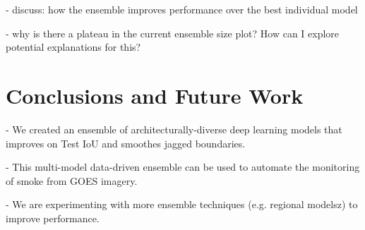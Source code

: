 \documentclass{article}
\begin{document}
- discuss: how the ensemble improves performance over the best individual model

- why is there a plateau in the current ensemble size plot? How can I explore potential explanations for this? 

\section{Conclusions and Future Work}
- We created an ensemble of architecturally-diverse deep learning models that improves on Test IoU and smoothes jagged boundaries.

- This multi-model data-driven ensemble can be used to automate the monitoring of smoke from GOES imagery.

- We are experimenting with more ensemble techniques (e.g. regional modelsz) to improve performance.





\end{document}
